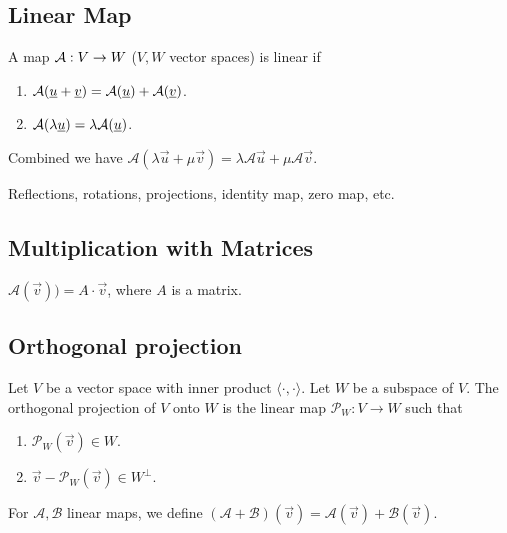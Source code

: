 \subsection{Linear Map}
\begin{definition}
    A map $\mathcal{A}: V \to W$ ($V, W$ vector spaces) is linear if
    \begin{enumerate}
        \item $\mathcal{A}(\underline{u} + \underline{v}) = \mathcal{A}(\underline{u}) + \mathcal{A}(\underline{v})$.
        \item $\mathcal{A}(\lambda\underline{u}) = \lambda \mathcal{A}(\underline{u})$.
    \end{enumerate}
    Combined we have $\mathcal{A}(\lambda \vec{u} + \mu \vec{v}) = \lambda\mathcal{A}\vec{u} + \mu\mathcal{A}\vec{v}$.
\end{definition}

\begin{example}
Reflections, rotations, projections, identity map, zero map, etc.
\end{example}

\subsection{Multiplication with Matrices}
$ \mathcal{A}(\vec{v})) = A \cdot \vec{v} $, where $A$ is a matrix.

\subsection{Orthogonal projection}
\begin{definition}
    Let $V$ be a vector space with inner product $\langle \cdot, \cdot \rangle$. Let $W$ be a subspace of $V$. The orthogonal projection of $V$ onto $W$ is the linear map $\mathcal{P}_W: V \to W$ such that
    \begin{enumerate}
        \item $\mathcal{P}_W(\vec{v}) \in W$.
        \item $\vec{v} - \mathcal{P}_W(\vec{v}) \in W^\perp$.
    \end{enumerate}
\end{definition}

\begin{theorem}[Addition]
    For $\mathcal{A}, \mathcal{B}$ linear maps, we define $(\mathcal{A} + \mathcal{B})(\vec{v}) = \mathcal{A}(\vec{v}) + \mathcal{B}(\vec{v})$.
\end{theorem}

